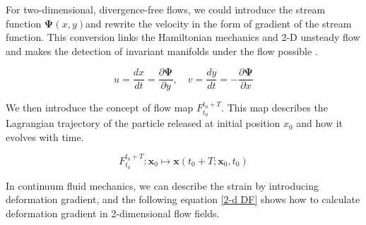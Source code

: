 For two-dimensional, divergence-free flows, we could introduce the stream function $\mathbf{\Psi}(x,y)$and rewrite the velocity in the form of gradient of the stream function. This conversion links the Hamiltonian mechanics and 2-D unsteady flow and makes the detection of invariant manifolds under the flow possible \cite{aref2017frontiers}.

\begin{equation}
    u=\frac{d x}{d t}=\frac{\partial \mathbf{\Psi}}{\partial y}, \quad v=\frac{d y}{d t}=-\frac{\partial \mathbf{\Psi}}{\partial x}
\end{equation}

We then introduce the concept of flow map $ F_{t_{0}}^{t_0+T} $. This map describes the Lagrangian trajectory of the particle released at initial position $x_0$ and how it evolves with time.

\begin{equation}
F_{t_{0}}^{t_0+T}: \mathbf{x}_{0} \mapsto \mathbf{x}\left(t_0+T;\mathbf{x}_{0}, t_{0}\right)
\end{equation}

In continuum fluid mechanics, we can describe the strain by introducing deformation gradient, and the following equation \ref{2-d DF} shows how to calculate deformation gradient in 2-dimensional flow fields.


